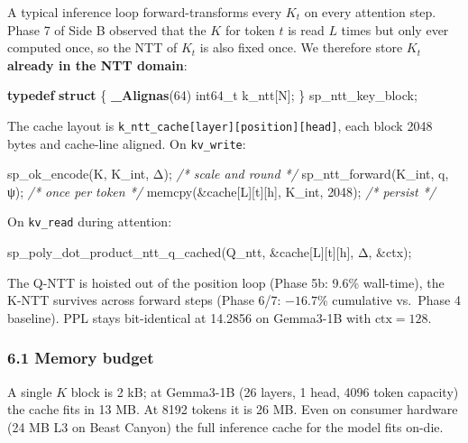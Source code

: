 \documentclass[
  11pt,
]{article}
\newenvironment{Shaded}{}{}
\newcommand{\CommentTok}[1]{\textcolor[rgb]{0.38,0.63,0.69}{\textit{#1}}}
\newcommand{\DataTypeTok}[1]{\textcolor[rgb]{0.56,0.13,0.00}{#1}}
\newcommand{\DecValTok}[1]{\textcolor[rgb]{0.25,0.63,0.44}{#1}}
\newcommand{\KeywordTok}[1]{\textcolor[rgb]{0.00,0.44,0.13}{\textbf{#1}}}
\newcommand{\NormalTok}[1]{#1}
\begin{document}
A typical inference loop forward-transforms every \(K_t\) on every
attention step. Phase 7 of Side B observed that the \(K\) for token
\(t\) is read \(L\) times but only ever computed once, so the NTT of
\(K_t\) is also fixed once. We therefore store \(K_t\) \textbf{already
in the NTT domain}:

\begin{Shaded}
\begin{Highlighting}[]
\KeywordTok{typedef} \KeywordTok{struct}\NormalTok{ \{ }\KeywordTok{\_Alignas}\NormalTok{(}\DecValTok{64}\NormalTok{) }\DataTypeTok{int64\_t}\NormalTok{ k\_ntt[N]; \} sp\_ntt\_key\_block;}
\end{Highlighting}
\end{Shaded}

The cache layout is
\texttt{k\_ntt\_cache{[}layer{]}{[}position{]}{[}head{]}}, each block
2048 bytes and cache-line aligned. On \texttt{kv\_write}:

\begin{Shaded}
\begin{Highlighting}[]
\NormalTok{sp\_ok\_encode(K, K\_int, Δ);            }\CommentTok{/* scale and round */}
\NormalTok{sp\_ntt\_forward(K\_int, q, ψ);          }\CommentTok{/* once per token */}
\NormalTok{memcpy(\&cache[L][t][h], K\_int, }\DecValTok{2048}\NormalTok{); }\CommentTok{/* persist */}
\end{Highlighting}
\end{Shaded}

On \texttt{kv\_read} during attention:

\begin{Shaded}
\begin{Highlighting}[]
\NormalTok{sp\_poly\_dot\_product\_ntt\_q\_cached(Q\_ntt, \&cache[L][t][h], Δ, \&ctx);}
\end{Highlighting}
\end{Shaded}

The Q-NTT is hoisted out of the position loop (Phase 5b: 9.6\%
wall-time), the K-NTT survives across forward steps (Phase 6/7:
\(-16.7\%\) cumulative vs.~Phase 4 baseline). PPL stays bit-identical at
14.2856 on Gemma3-1B with \(\mathrm{ctx}=128\).

\hypertarget{memory-budget}{%
\subsubsection{6.1 Memory budget}\label{memory-budget}}

A single \(K\) block is 2 kB; at Gemma3-1B (26 layers, 1 head, 4096
token capacity) the cache fits in 13 MB. At 8192 tokens it is 26 MB.
Even on consumer hardware (24 MB L3 on Beast Canyon) the full inference
cache for the model fits on-die.
\end{document}

